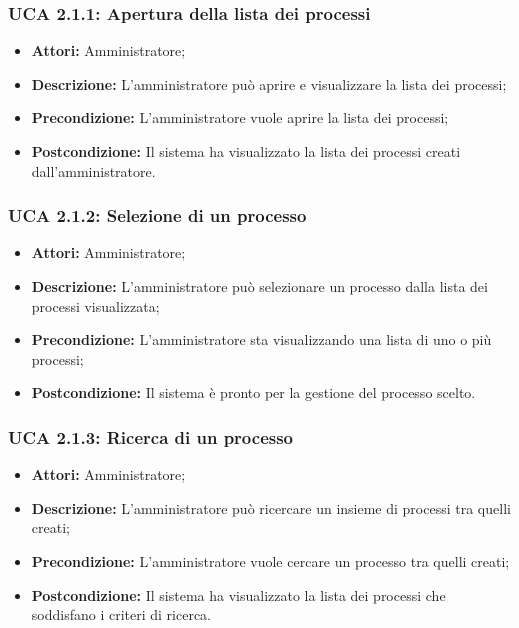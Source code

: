 \hypertarget{A2.1.1}{}
\subsubsection{UCA 2.1.1: Apertura della lista dei processi}
\begin{itemize}
\item \textbf{Attori:} Amministratore;
\item \textbf{Descrizione:} L'amministratore può aprire e visualizzare la lista dei processi;
\item \textbf{Precondizione:} L'amministratore vuole aprire la lista dei processi;
\item \textbf{Postcondizione:} Il sistema ha visualizzato la lista dei processi creati dall'amministratore.
\end{itemize}

\hypertarget{A2.1.2}{}
\subsubsection{UCA 2.1.2: Selezione di un processo}
\begin{itemize}
\item \textbf{Attori:} Amministratore;
\item \textbf{Descrizione:} L'amministratore può selezionare un processo dalla lista dei processi visualizzata;
\item \textbf{Precondizione:} L'amministratore sta visualizzando una lista di uno o più processi;
\item \textbf{Postcondizione:} Il sistema è pronto per la gestione del processo scelto.
\end{itemize}

\hypertarget{A2.1.3}{}
\subsubsection{UCA 2.1.3: Ricerca di un processo}
\begin{itemize}
\item \textbf{Attori:} Amministratore;
\item \textbf{Descrizione:} L'amministratore può ricercare un insieme di processi tra quelli creati;
\item \textbf{Precondizione:} L'amministratore vuole cercare un processo tra quelli creati;
\item \textbf{Postcondizione:} Il sistema ha visualizzato la lista dei processi che soddisfano i criteri di ricerca.
\end{itemize}

